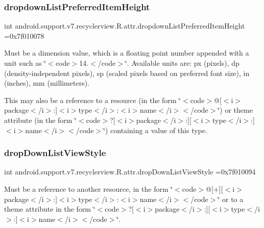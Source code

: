 \subsubsection{\texorpdfstring{dropdown\+List\+Preferred\+Item\+Height}{dropdownListPreferredItemHeight}}
{\footnotesize\ttfamily int android.\+support.\+v7.\+recyclerview.\+R.\+attr.\+dropdown\+List\+Preferred\+Item\+Height =0x7f010078\hspace{0.3cm}{\ttfamily [static]}}

Must be a dimension value, which is a floating point number appended with a unit such as \char`\"{}$<$code$>$14.\+5sp$<$/code$>$\char`\"{}. Available units are\+: px (pixels), dp (density-\/independent pixels), sp (scaled pixels based on preferred font size), in (inches), mm (millimeters). 

This may also be a reference to a resource (in the form \char`\"{}$<$code$>$@\mbox{[}$<$i$>$package$<$/i$>$\+:\mbox{]}$<$i$>$type$<$/i$>$\+:$<$i$>$name$<$/i$>$$<$/code$>$\char`\"{}) or theme attribute (in the form \char`\"{}$<$code$>$?\mbox{[}$<$i$>$package$<$/i$>$\+:\mbox{]}\mbox{[}$<$i$>$type$<$/i$>$\+:\mbox{]}$<$i$>$name$<$/i$>$$<$/code$>$\char`\"{}) containing a value of this type. \mbox{\label{classandroid_1_1support_1_1v7_1_1recyclerview_1_1R_1_1attr_afa306615c822ff20ead7cb5283f85816}} 
\subsubsection{\texorpdfstring{drop\+Down\+List\+View\+Style}{dropDownListViewStyle}}
{\footnotesize\ttfamily int android.\+support.\+v7.\+recyclerview.\+R.\+attr.\+drop\+Down\+List\+View\+Style =0x7f010094\hspace{0.3cm}{\ttfamily [static]}}

Must be a reference to another resource, in the form \char`\"{}$<$code$>$@\mbox{[}+\mbox{]}\mbox{[}$<$i$>$package$<$/i$>$\+:\mbox{]}$<$i$>$type$<$/i$>$\+:$<$i$>$name$<$/i$>$$<$/code$>$\char`\"{} or to a theme attribute in the form \char`\"{}$<$code$>$?\mbox{[}$<$i$>$package$<$/i$>$\+:\mbox{]}\mbox{[}$<$i$>$type$<$/i$>$\+:\mbox{]}$<$i$>$name$<$/i$>$$<$/code$>$\char`\"{}. \mbox{\label{classandroid_1_1support_1_1v7_1_1recyclerview_1_1R_1_1attr_aaf67b9943713c3544f8bfb157df4bcaf}} 

